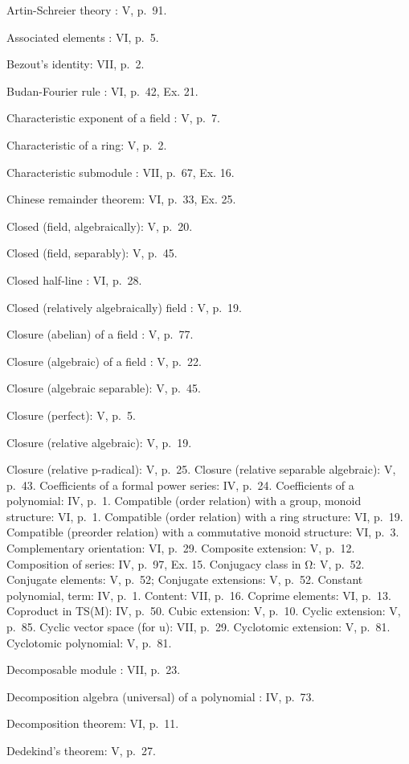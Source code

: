 Artin-Schreier theory : V, p.~91.

Associated elements : VI, p.~5.

Bezout's identity: VII, p.~2.

Budan-Fourier rule : VI, p.~42, Ex. 21.

Characteristic exponent of a field : V, p.~7.

Characteristic of a ring: V, p.~2.

Characteristic submodule : VII, p.~67, Ex. 16.

Chinese remainder theorem: VI, p.~33, Ex. 25.

Closed (field, algebraically): V, p.~20.

Closed (field, separably): V, p.~45.

Closed half-line : VI, p.~28.

Closed (relatively algebraically) field : V, p.~19.

Closure (abelian) of a field : V, p.~77.

Closure (algebraic) of a field : V, p.~22.

Closure (algebraic separable): V, p.~45.

Closure (perfect): V, p.~5.

Closure (relative algebraic): V, p.~19.

Closure (relative p-radical): V, p.~25. Closure (relative separable algebraic): V, p.~43. Coefficients of a formal power series: IV, p.~24. Coefficients of a polynomial: IV, p.~1. Compatible (order relation) with a group, monoid structure: VI, p.~1. Compatible (order relation) with a ring structure: VI, p.~19. Compatible (preorder relation) with a commutative monoid structure: VI, p.~3. Complementary orientation: VI, p.~29. Composite extension: V, p.~12. Composition of series: IV, p.~97, Ex. 15. Conjugacy class in Ω: V, p.~52. Conjugate elements: V, p.~52; Conjugate extensions: V, p.~52. Constant polynomial, term: IV, p.~1. Content: VII, p.~16. Coprime elements: VI, p.~13. Coproduct in TS(M): IV, p.~50. Cubic extension: V, p.~10. Cyclic extension: V, p.~85. Cyclic vector space (for u): VII, p.~29. Cyclotomic extension: V, p.~81. Cyclotomic polynomial: V, p.~81.

Decomposable module : VII, p.~23.

Decomposition algebra (universal) of a polynomial : IV, p.~73.

Decomposition theorem: VI, p.~11.

Dedekind's theorem: V, p.~27.

